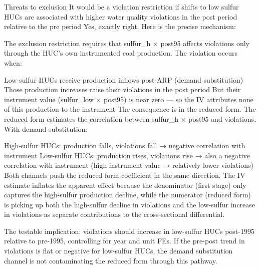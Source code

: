 \documentclass{beamer}
\begin{document}
\begin{frame}{Threats to exclusion}
    It would be a violation restriction if shifts to low sulfur HUCs are associated with higher water quality violations in the post period relative to the pre period
Yes, exactly right. Here is the precise mechanism:

The exclusion restriction requires that sulfur_h × post95 affects violations only through the HUC's own instrumented coal production. The violation occurs when:

Low-sulfur HUCs receive production inflows post-ARP (demand substitution)
Those production increases raise their violations in the post period
But their instrument value (sulfur_low × post95) is near zero — so the IV attributes none of this production to the instrument
The consequence is in the reduced form. The reduced form estimates the correlation between sulfur_h × post95 and violations. With demand substitution:

High-sulfur HUCs: production falls, violations fall → negative correlation with instrument
Low-sulfur HUCs: production rises, violations rise → also a negative correlation with instrument (high instrument value → relatively lower violations)
Both channels push the reduced form coefficient in the same direction. The IV estimate inflates the apparent effect because the denominator (first stage) only captures the high-sulfur production decline, while the numerator (reduced form) is picking up both the high-sulfur decline in violations and the low-sulfur increase in violations as separate contributions to the cross-sectional differential.

The testable implication: violations should increase in low-sulfur HUCs post-1995 relative to pre-1995, controlling for year and unit FEs. If the pre-post trend in violations is flat or negative for low-sulfur HUCs, the demand substitution channel is not contaminating the reduced form through this pathway.
\end{frame}
\end{document}
